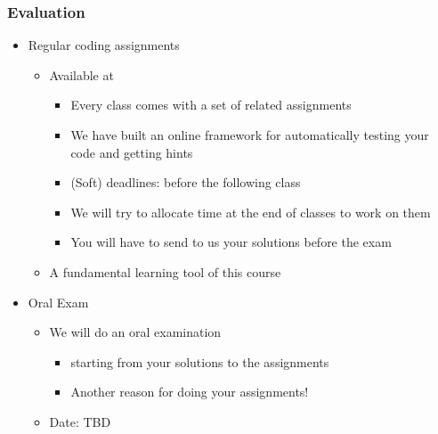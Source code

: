 \documentclass{beamer}%
\begin{document}
\begin{frame}
  \frametitle{Evaluation}

  \begin{itemize}
  \item Regular coding assignments
    \begin{itemize}
    \item Available at \myurl{\homepage}
    \begin{itemize}
	\item Every class comes with a set of related assignments
	\item We have built an online framework for automatically testing your code and getting hints
    \item (Soft) deadlines: before the following class
    \item We will try to allocate time at the end of classes to work on them
    \item You will have to send to us your solutions before the exam
	\end{itemize}
	\item {\color{red}A fundamental learning tool of this course}
    \end{itemize}
  \item Oral Exam
    \begin{itemize}
	\item We will do an oral examination
	    \begin{itemize}
	   \item  starting from your solutions to the assignments 	
	   \item {\color{red}Another reason for doing your assignments!}
    	\end{itemize}
    \item Date: TBD
  \end{itemize}
    \end{itemize}
\end{frame}
\end{document}
